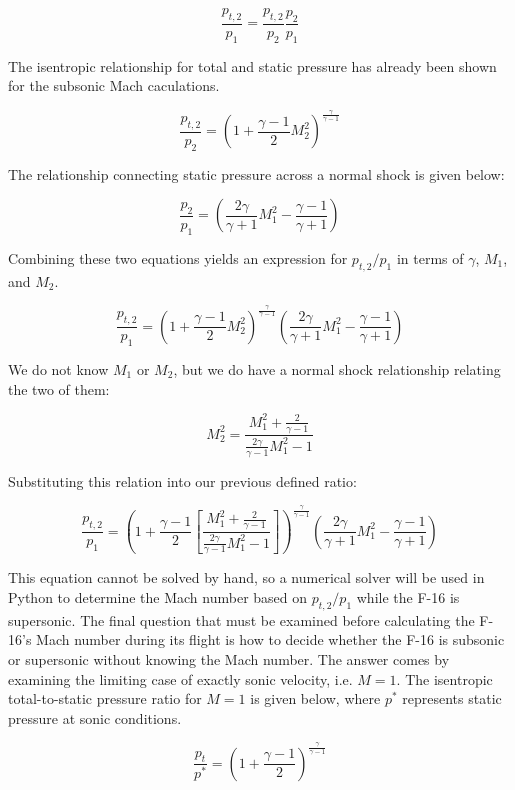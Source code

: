 \documentclass[../main.tex]{subfiles}
\begin{document}
\[
    \frac{p_{t,2}}{p_1} = 
    \frac{p_{t,2}}{p_2}
    \frac{p_2}{p_1}
\]

The isentropic relationship for total and static pressure has already been shown for the subsonic Mach caculations.

\[
    \frac{p_{t,2}}{p_2} = 
    {\left({1 + \frac{\gamma-1}{2}M_2^2}\right)}
    ^{\frac{\gamma}{\gamma-1}}
\]

The relationship connecting static pressure across a normal shock is given below:

\[
    \frac{p_2}{p_1} = 
    \left({
    \frac{2 \gamma}{\gamma+1} M_1^2 -
    \frac{\gamma-1}{\gamma+1}
    }\right)
\]

Combining these two equations yields an expression for \(p_{t,2}/p_1\) in terms of \(\gamma\), \(M_1\), and \(M_2\).

\[
    \frac{p_{t,2}}{p_1} = 
    {\left({1 + \frac{\gamma-1}{2}M_2^2}\right)}
    ^{\frac{\gamma}{\gamma-1}}
    \left({
    \frac{2 \gamma}{\gamma+1} M_1^2 -
    \frac{\gamma-1}{\gamma+1}
    }\right)
\]

We do not know \(M_1\) or \(M_2\), but we do have a normal shock relationship relating the two of them:

\[
    M_2^2
    =
    \frac{M_1^2 + \frac{2}{\gamma-1}}{\frac{2\gamma}{\gamma-1}M_1^2-1}
\]

Substituting this relation into our previous defined ratio:

\[
    \frac{p_{t,2}}{p_1} = 
    {\left({1 + \frac{\gamma-1}{2} {\left[{\frac{M_1^2 + \frac{2}{\gamma-1}}{\frac{2\gamma}{\gamma-1}M_1^2-1}}\right]} }\right)}
    ^{\frac{\gamma}{\gamma-1}}
    \left({
    \frac{2 \gamma}{\gamma+1} M_1^2 -
    \frac{\gamma-1}{\gamma+1}
    }\right)
\]

This equation cannot be solved by hand, so a numerical solver will be used in Python to determine the Mach number based on \(p_{t,2}/p_1\) while the F-16 is supersonic.
The final question that must be examined before calculating the F-16's Mach number during its flight is how to decide whether the F-16 is subsonic or supersonic without knowing the Mach number.
The answer comes by examining the limiting case of exactly sonic velocity, i.e. \(M=1\).
The isentropic total-to-static pressure ratio for \(M=1\) is given below, where \(p^*\) represents static pressure at sonic conditions.

\[
    \frac{p_{t}}{p^*} = 
    {\left({1 + \frac{\gamma-1}{2}}\right)}
    ^{\frac{\gamma}{\gamma-1}}
\]
\end{document}
